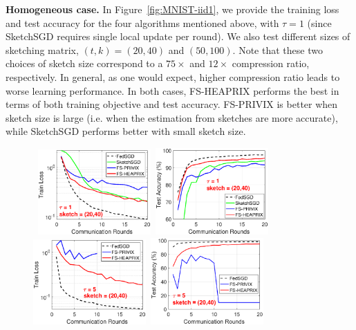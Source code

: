 \documentclass[twoside]{article}
\begin{document}
\textbf{Homogeneous case.} In Figure~\ref{fig:MNIST-iid1}, we provide the training loss and test accuracy for the four algorithms mentioned above, with $\tau=1$ (since SketchSGD requires single local update per round). 
We also test different sizes of sketching matrix, $(t,k)=(20,40)$ and $(50,100)$. Note that these two choices of sketch size correspond to a $75\times$ and $12\times$ compression ratio, respectively. 
In general, as one would expect, higher compression ratio leads to worse learning performance. In both cases, FS-HEAPRIX performs the best in terms of both training objective and test accuracy. FS-PRIVIX is better when sketch size is large (i.e. when the estimation from sketches are more accurate), while SketchSGD performs better with small sketch size. 
\begin{figure}[t]
	\begin{center}
		\mbox{			  
		 \includegraphics[width=1.7in]{MNIST_figures/local1_sketch20_iid1_train_loss.eps} \hspace{-0.2in}
		 \includegraphics[width=1.7in]{MNIST_figures/local1_sketch20_iid1_test_acc.eps} \hspace{-0.2in}
		 }
		\mbox{
		\includegraphics[width=1.7in]{MNIST_figures/local5_sketch20_iid1_train_loss.eps}\hspace{-0.2in}
		\includegraphics[width=1.7in]{MNIST_figures/local5_sketch20_iid1_test_acc.eps}\hspace{-0.2in}
}
\end{center}
\end{figure}
\end{document}

